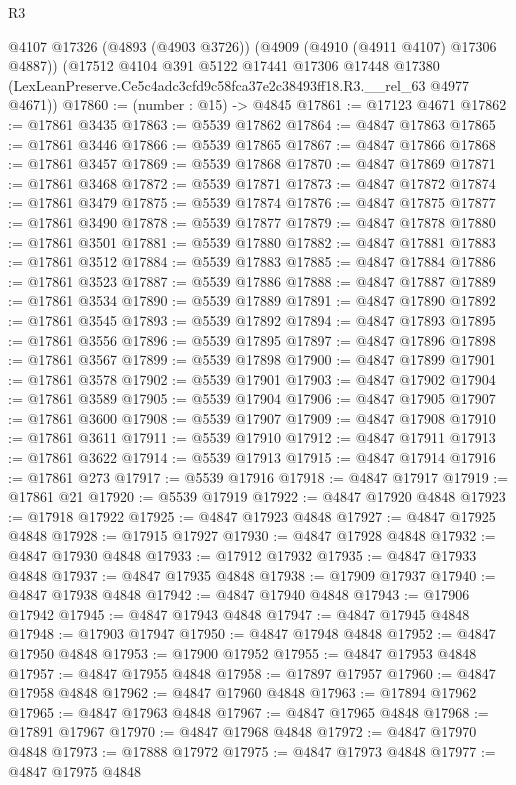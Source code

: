 \begin{lexlean}{R3}
\begin{coremodule}
    @4107
    @17326
    (@4893 (@4903 @3726))
    (@4909 (@4910 (@4911 @4107) @17306 @4887))
    (@17512
      @4104
      @391
      @5122
      @17441
      @17306
      @17448
      @17380
      (LexLeanPreserve.Ce5c4adc3cfd9c58fca37e2c38493ff18.R3.__rel_63 @4977 @4671))
@17860 := (number : @15) -> @4845
@17861 := @17123 @4671
@17862 := @17861 @3435
@17863 := @5539 @17862
@17864 := @4847 @17863
@17865 := @17861 @3446
@17866 := @5539 @17865
@17867 := @4847 @17866
@17868 := @17861 @3457
@17869 := @5539 @17868
@17870 := @4847 @17869
@17871 := @17861 @3468
@17872 := @5539 @17871
@17873 := @4847 @17872
@17874 := @17861 @3479
@17875 := @5539 @17874
@17876 := @4847 @17875
@17877 := @17861 @3490
@17878 := @5539 @17877
@17879 := @4847 @17878
@17880 := @17861 @3501
@17881 := @5539 @17880
@17882 := @4847 @17881
@17883 := @17861 @3512
@17884 := @5539 @17883
@17885 := @4847 @17884
@17886 := @17861 @3523
@17887 := @5539 @17886
@17888 := @4847 @17887
@17889 := @17861 @3534
@17890 := @5539 @17889
@17891 := @4847 @17890
@17892 := @17861 @3545
@17893 := @5539 @17892
@17894 := @4847 @17893
@17895 := @17861 @3556
@17896 := @5539 @17895
@17897 := @4847 @17896
@17898 := @17861 @3567
@17899 := @5539 @17898
@17900 := @4847 @17899
@17901 := @17861 @3578
@17902 := @5539 @17901
@17903 := @4847 @17902
@17904 := @17861 @3589
@17905 := @5539 @17904
@17906 := @4847 @17905
@17907 := @17861 @3600
@17908 := @5539 @17907
@17909 := @4847 @17908
@17910 := @17861 @3611
@17911 := @5539 @17910
@17912 := @4847 @17911
@17913 := @17861 @3622
@17914 := @5539 @17913
@17915 := @4847 @17914
@17916 := @17861 @273
@17917 := @5539 @17916
@17918 := @4847 @17917
@17919 := @17861 @21
@17920 := @5539 @17919
@17922 := @4847 @17920 @4848
@17923 := @17918 @17922
@17925 := @4847 @17923 @4848
@17927 := @4847 @17925 @4848
@17928 := @17915 @17927
@17930 := @4847 @17928 @4848
@17932 := @4847 @17930 @4848
@17933 := @17912 @17932
@17935 := @4847 @17933 @4848
@17937 := @4847 @17935 @4848
@17938 := @17909 @17937
@17940 := @4847 @17938 @4848
@17942 := @4847 @17940 @4848
@17943 := @17906 @17942
@17945 := @4847 @17943 @4848
@17947 := @4847 @17945 @4848
@17948 := @17903 @17947
@17950 := @4847 @17948 @4848
@17952 := @4847 @17950 @4848
@17953 := @17900 @17952
@17955 := @4847 @17953 @4848
@17957 := @4847 @17955 @4848
@17958 := @17897 @17957
@17960 := @4847 @17958 @4848
@17962 := @4847 @17960 @4848
@17963 := @17894 @17962
@17965 := @4847 @17963 @4848
@17967 := @4847 @17965 @4848
@17968 := @17891 @17967
@17970 := @4847 @17968 @4848
@17972 := @4847 @17970 @4848
@17973 := @17888 @17972
@17975 := @4847 @17973 @4848
@17977 := @4847 @17975 @4848

\end{coremodule}
\end{lexlean}

